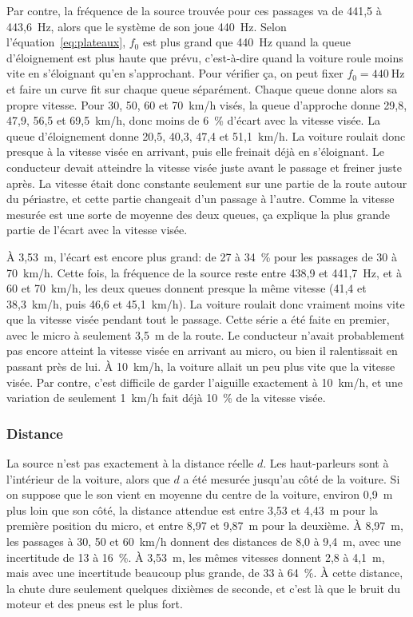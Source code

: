 \documentclass[11pt,letterpaper]{article}
\begin{document}
Par contre, la fréquence de la source trouvée pour ces passages va de 441,5 à 443,6~Hz, alors que le système de son joue 440~Hz. Selon l'équation~\ref{eq:plateaux}, $f_0$ est plus grand que 440~Hz quand la queue d'éloignement est plus haute que prévu, c'est-à-dire quand la voiture roule moins vite en s'éloignant qu'en s'approchant. Pour vérifier ça, on peut fixer $f_0 = 440~\text{Hz}$ et faire un curve fit sur chaque queue séparément. Chaque queue donne alors sa propre vitesse. Pour 30, 50, 60 et 70~km/h visés, la queue d'approche donne 29,8, 47,9, 56,5 et 69,5~km/h, donc moins de 6~\% d'écart avec la vitesse visée. La queue d'éloignement donne 20,5, 40,3, 47,4 et 51,1~km/h. La voiture roulait donc presque à la vitesse visée en arrivant, puis elle freinait déjà en s'éloignant. Le conducteur devait atteindre la vitesse visée juste avant le passage et freiner juste après. La vitesse était donc constante seulement sur une partie de la route autour du périastre, et cette partie changeait d'un passage à l'autre. Comme la vitesse mesurée est une sorte de moyenne des deux queues, ça explique la plus grande partie de l'écart avec la vitesse visée.

À 3,53~m, l'écart est encore plus grand: de 27 à 34~\% pour les passages de 30 à 70~km/h. Cette fois, la fréquence de la source reste entre 438,9 et 441,7~Hz, et à 60 et 70~km/h, les deux queues donnent presque la même vitesse (41,4 et 38,3~km/h, puis 46,6 et 45,1~km/h). La voiture roulait donc vraiment moins vite que la vitesse visée pendant tout le passage. Cette série a été faite en premier, avec le micro à seulement 3,5~m de la route. Le conducteur n'avait probablement pas encore atteint la vitesse visée en arrivant au micro, ou bien il ralentissait en passant près de lui. À 10~km/h, la voiture allait un peu plus vite que la vitesse visée. Par contre, c'est difficile de garder l'aiguille exactement à 10~km/h, et une variation de seulement 1~km/h fait déjà 10~\% de la vitesse visée.

\subsubsection*{Distance}
La source n'est pas exactement à la distance réelle $d$. Les haut-parleurs sont à l'intérieur de la voiture, alors que $d$ a été mesurée jusqu'au côté de la voiture. Si on suppose que le son vient en moyenne du centre de la voiture, environ 0,9~m plus loin que son côté, la distance attendue est entre 3,53 et 4,43~m pour la première position du micro, et entre 8,97 et 9,87~m pour la deuxième. À 8,97~m, les passages à 30, 50 et 60~km/h donnent des distances de 8,0 à 9,4~m, avec une incertitude de 13 à 16~\%. À 3,53~m, les mêmes vitesses donnent 2,8 à 4,1~m, mais avec une incertitude beaucoup plus grande, de 33 à 64~\%. À cette distance, la chute dure seulement quelques dixièmes de seconde, et c'est là que le bruit du moteur et des pneus est le plus fort.
\end{document}
